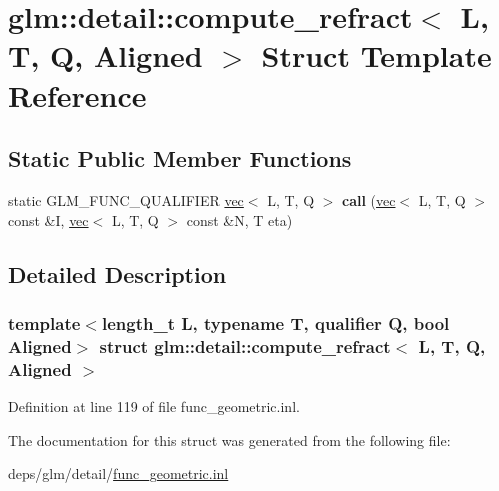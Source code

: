 \hypertarget{structglm_1_1detail_1_1compute__refract}{}\section{glm\+:\+:detail\+:\+:compute\+\_\+refract$<$ L, T, Q, Aligned $>$ Struct Template Reference}
\label{structglm_1_1detail_1_1compute__refract}
\subsection*{Static Public Member Functions}
\begin{DoxyCompactItemize}
\item 
\mbox{\label{structglm_1_1detail_1_1compute__refract_a17b1fde43c425c596ff032f5a92f15de}} 
static G\+L\+M\+\_\+\+F\+U\+N\+C\+\_\+\+Q\+U\+A\+L\+I\+F\+I\+ER \hyperlink{structglm_1_1vec}{vec}$<$ L, T, Q $>$ {\bfseries call} (\hyperlink{structglm_1_1vec}{vec}$<$ L, T, Q $>$ const \&I, \hyperlink{structglm_1_1vec}{vec}$<$ L, T, Q $>$ const \&N, T eta)
\end{DoxyCompactItemize}


\subsection{Detailed Description}
\subsubsection*{template$<$length\+\_\+t L, typename T, qualifier Q, bool Aligned$>$\newline
struct glm\+::detail\+::compute\+\_\+refract$<$ L, T, Q, Aligned $>$}



Definition at line 119 of file func\+\_\+geometric.\+inl.



The documentation for this struct was generated from the following file\+:\begin{DoxyCompactItemize}
\item 
deps/glm/detail/\hyperlink{func__geometric_8inl}{func\+\_\+geometric.\+inl}\end{DoxyCompactItemize}
